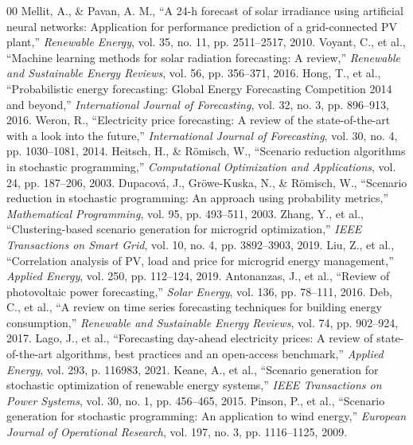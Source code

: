 \documentclass[conference]{IEEEtran}
\begin{document}
\begin{thebibliography}{00}
 Mellit, A., \& Pavan, A. M., ``A 24-h forecast of solar irradiance using artificial neural networks: Application for performance prediction of a grid-connected PV plant,'' \textit{Renewable Energy}, vol. 35, no. 11, pp. 2511--2517, 2010.
 Voyant, C., et al., ``Machine learning methods for solar radiation forecasting: A review,'' \textit{Renewable and Sustainable Energy Reviews}, vol. 56, pp. 356--371, 2016.
 Hong, T., et al., ``Probabilistic energy forecasting: Global Energy Forecasting Competition 2014 and beyond,'' \textit{International Journal of Forecasting}, vol. 32, no. 3, pp. 896--913, 2016.
 Weron, R., ``Electricity price forecasting: A review of the state-of-the-art with a look into the future,'' \textit{International Journal of Forecasting}, vol. 30, no. 4, pp. 1030--1081, 2014.
 Heitsch, H., \& R\"omisch, W., ``Scenario reduction algorithms in stochastic programming,'' \textit{Computational Optimization and Applications}, vol. 24, pp. 187--206, 2003.
 Dupacov\'a, J., Gr\"owe-Kuska, N., \& R\"omisch, W., ``Scenario reduction in stochastic programming: An approach using probability metrics,'' \textit{Mathematical Programming}, vol. 95, pp. 493--511, 2003.
 Zhang, Y., et al., ``Clustering-based scenario generation for microgrid optimization,'' \textit{IEEE Transactions on Smart Grid}, vol. 10, no. 4, pp. 3892--3903, 2019.
 Liu, Z., et al., ``Correlation analysis of PV, load and price for microgrid energy management,'' \textit{Applied Energy}, vol. 250, pp. 112--124, 2019.
 Antonanzas, J., et al., ``Review of photovoltaic power forecasting,'' \textit{Solar Energy}, vol. 136, pp. 78--111, 2016.
 Deb, C., et al., ``A review on time series forecasting techniques for building energy consumption,'' \textit{Renewable and Sustainable Energy Reviews}, vol. 74, pp. 902--924, 2017.
 Lago, J., et al., ``Forecasting day-ahead electricity prices: A review of state-of-the-art algorithms, best practices and an open-access benchmark,'' \textit{Applied Energy}, vol. 293, p. 116983, 2021.
 Keane, A., et al., ``Scenario generation for stochastic optimization of renewable energy systems,'' \textit{IEEE Transactions on Power Systems}, vol. 30, no. 1, pp. 456--465, 2015.
 Pinson, P., et al., ``Scenario generation for stochastic programming: An application to wind energy,'' \textit{European Journal of Operational Research}, vol. 197, no. 3, pp. 1116--1125, 2009.

\end{thebibliography}
\end{document}
